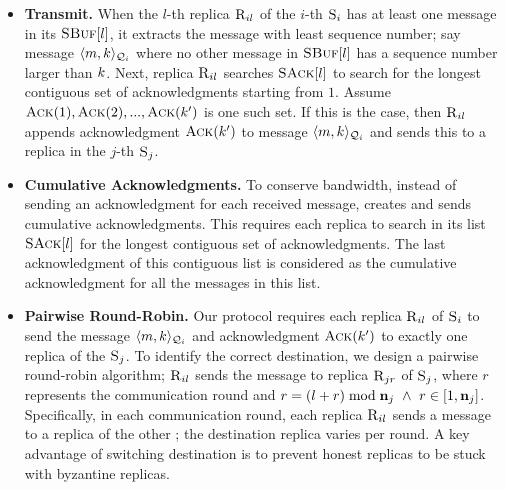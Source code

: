 \begin{itemize}[wide]
\item {\bf Transmit.}
When the $l$-th replica $\textsc{R}_{{i}{l}}$ of the $i$-th \RSM{} $\textsc{S}_{i}$ has 
at least one message in its $\textsc{SBuf}[{l}]$, 
it extracts the message with least sequence number; 
say message $\langle m, k\rangle_{\mathcal{Q}_{i}}$ where no other message in $\textsc{SBuf}[{l}]$ has a sequence number larger than $k$.
Next, replica $\textsc{R}_{{i}{l}}$ searches $\textsc{SAck}[{l}]$ to search for the longest contiguous set of acknowledgments starting from $1$. 
Assume $\textsc{Ack}(1), \textsc{Ack}(2), ... , \textsc{Ack}(k')$ is one such set.
If this is the case, then $\textsc{R}_{{i}{l}}$ appends acknowledgment $\textsc{Ack}(k')$ to message $\langle m, k\rangle_{\mathcal{Q}_{i}}$ and 
sends this to a replica in the $j$-th \RSM{} $\textsc{S}_{j}$.


\item {\bf Cumulative Acknowledgments.}
To conserve bandwidth, instead of sending an acknowledgment for each received message, 
\Scrooge{} creates and sends cumulative acknowledgments. 
This requires each replica to search in its list $\textsc{SAck}[{l}]$ for the longest contiguous set of acknowledgments. 
The last acknowledgment of this contiguous list is considered as the cumulative acknowledgment for all the 
messages in this list. 


\item {\bf Pairwise Round-Robin.}
Our \Scrooge{} protocol requires each replica $\textsc{R}_{{i}{l}}$ of \RSM{} $\textsc{S}_{i}$ to send the message
$\langle m, k\rangle_{\mathcal{Q}_{i}}$ and acknowledgment $\textsc{Ack}(k')$ to exactly one replica of the \RSM{} $\textsc{S}_{j}$.
To identify the correct destination, we design a pairwise round-robin algorithm; 
$\textsc{R}_{{i}{l}}$ sends the message to replica $\textsc{R}_{{j}{r}}$ of \RSM{} $\textsc{S}_{j}$, 
where $r$ represents the communication round and $r = (l+r) \bmod \textbf{n}_{j} ~\wedge ~r \in [1,\textbf{n}_{j}]$.
Specifically, in each communication round, each replica $\textsc{R}_{{i}{l}}$ 
sends a message to a replica of the other \RSM{}; the destination replica varies per round.
A key advantage of switching destination is to prevent honest replicas to be stuck with byzantine replicas.





\end{itemize}
